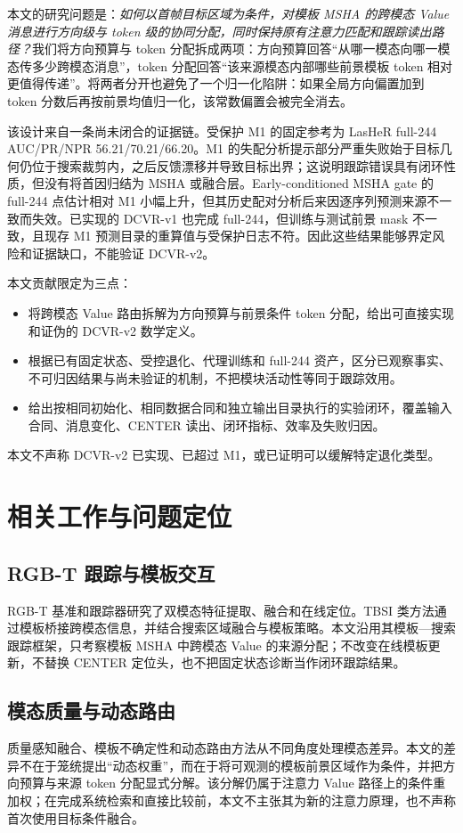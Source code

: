 \documentclass[journal]{IEEEtran}
\begin{document}
本文的研究问题是：\emph{如何以首帧目标区域为条件，对模板 MSHA 的跨模态 Value 消息进行方向级与 token 级的协同分配，同时保持原有注意力匹配和跟踪读出路径？}我们将方向预算与 token 分配拆成两项：方向预算回答“从哪一模态向哪一模态传多少跨模态消息”，token 分配回答“该来源模态内部哪些前景模板 token 相对更值得传递”。将两者分开也避免了一个归一化陷阱：如果全局方向偏置加到 token 分数后再按前景均值归一化，该常数偏置会被完全消去。

该设计来自一条尚未闭合的证据链。受保护 M1 的固定参考为 LasHeR full-244 AUC/PR/NPR 56.21/70.21/66.20。M1 的失配分析提示部分严重失败始于目标几何仍位于搜索裁剪内，之后反馈漂移并导致目标出界；这说明跟踪错误具有闭环性质，但没有将首因归结为 MSHA 或融合层。Early-conditioned MSHA gate 的 full-244 点估计相对 M1 小幅上升，但其历史配对分析后来因逐序列预测来源不一致而失效。已实现的 DCVR-v1 也完成 full-244，但训练与测试前景 mask 不一致，且现存 M1 预测目录的重算值与受保护日志不符。因此这些结果能够界定风险和证据缺口，不能验证 DCVR-v2。

本文贡献限定为三点：
\begin{itemize}
  \item 将跨模态 Value 路由拆解为方向预算与前景条件 token 分配，给出可直接实现和证伪的 DCVR-v2 数学定义。
  \item 根据已有固定状态、受控退化、代理训练和 full-244 资产，区分已观察事实、不可归因结果与尚未验证的机制，不把模块活动性等同于跟踪效用。
  \item 给出按相同初始化、相同数据合同和独立输出目录执行的实验闭环，覆盖输入合同、消息变化、CENTER 读出、闭环指标、效率及失败归因。
\end{itemize}
本文不声称 DCVR-v2 已实现、已超过 M1，或已证明可以缓解特定退化类型。

\section{相关工作与问题定位}
\subsection{RGB-T 跟踪与模板交互}
RGB-T 基准和跟踪器研究了双模态特征提取、融合和在线定位\cite{li2019benchmark,li2022lasher,tang2025mvrgbt}。TBSI 类方法通过模板桥接跨模态信息，并结合搜索区域融合与模板策略\cite{hui2023tbsi,li2025tbsi}。本文沿用其模板—搜索跟踪框架，只考察模板 MSHA 中跨模态 Value 的来源分配；不改变在线模板更新，不替换 CENTER 定位头，也不把固定状态诊断当作闭环跟踪结果。

\subsection{模态质量与动态路由}
质量感知融合、模板不确定性和动态路由方法从不同角度处理模态差异\cite{ding2025qstnet,ding2025tumnet,ding2026routing}。本文的差异不在于笼统提出“动态权重”，而在于将可观测的模板前景区域作为条件，并把方向预算与来源 token 分配显式分解。该分解仍属于注意力 Value 路径上的条件重加权；在完成系统检索和直接比较前，本文不主张其为新的注意力原理，也不声称首次使用目标条件融合。
\end{document}
